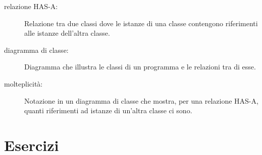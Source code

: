 \documentclass[10pt]{book}
\begin{document}
\begin{description}
\item[relazione HAS-A:] Relazione tra due classi dove le istanze di una classe contengono riferimenti alle istanze dell'altra classe.

\item[diagramma di classe:] Diagramma che illustra le classi di un programma e le relazioni tra di esse.

\item[molteplicità:] Notazione in un diagramma di classe che mostra, per una relazione HAS-A, quanti riferimenti ad istanze di un'altra classe ci sono.

\end{description}


\section{Esercizi}
\end{document}
